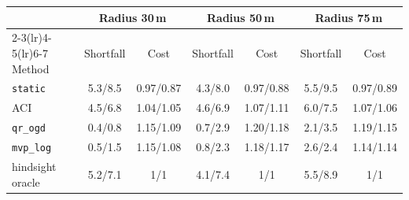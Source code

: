 \setlength{\tabcolsep}{3.0pt}
\begin{tabular}{@{}lcccccc@{}}
\toprule
 & \multicolumn{2}{c}{Radius 30\,m} & \multicolumn{2}{c}{Radius 50\,m} & \multicolumn{2}{c}{Radius 75\,m} \\
\cmidrule(lr){2-3}\cmidrule(lr){4-5}\cmidrule(lr){6-7}
Method & Shortfall & Cost & Shortfall & Cost & Shortfall & Cost \\
\midrule
\texttt{static} & 5.3/8.5 & 0.97/0.87 & 4.3/8.0 & 0.97/0.88 & 5.5/9.5 & 0.97/0.89 \\
ACI & 4.5/6.8 & 1.04/1.05 & 4.6/6.9 & 1.07/1.11 & 6.0/7.5 & 1.07/1.06 \\
\texttt{qr\_ogd} & 0.4/0.8 & 1.15/1.09 & 0.7/2.9 & 1.20/1.18 & 2.1/3.5 & 1.19/1.15 \\
\texttt{mvp\_log} & 0.5/1.5 & 1.15/1.08 & 0.8/2.3 & 1.18/1.17 & 2.6/2.4 & 1.14/1.14 \\
hindsight oracle & 5.2/7.1 & 1/1 & 4.1/7.4 & 1/1 & 5.5/8.9 & 1/1 \\
\bottomrule
\end{tabular}

